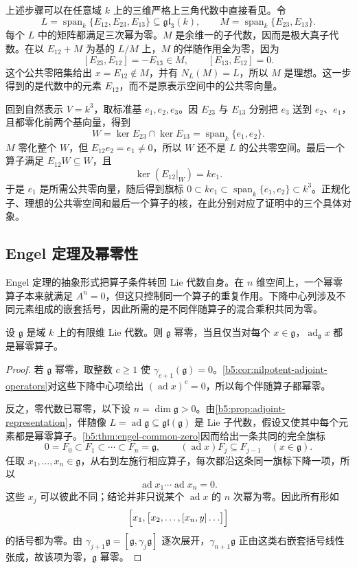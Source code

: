 上述步骤可以在任意域 \(k\) 上的三维严格上三角代数中直接看见。令
\[
	L=\operatorname{span}_k\{E_{12},E_{23},E_{13}\} \subseteq\mathfrak{gl}_3(k),\qquad M=\operatorname{span}_k\{E_{23},E_{13}\}.
\]
每个 \(L\) 中的矩阵都满足三次幂为零。\(M\) 是余维一的子代数，因而是极大真子代数。在以 \(E_{12}+M\) 为基的 \(L/M\) 上，\(M\) 的伴随作用全为零，因为
\[
	[E_{23},E_{12}]=-E_{13}\in M,\qquad [E_{13},E_{12}]=0.
\]
这个公共零陪集给出 \(x=E_{12}\notin M\)，并有 \(N_L(M)=L\)，所以 \(M\) 是理想。这一步得到的是代数中的元素 \(E_{12}\)，而不是原表示空间中的公共零向量。

\ProseParagraphBreak

回到自然表示 \(V=k^3\)，取标准基 \(e_1,e_2,e_3\)。因 \(E_{23}\) 与 \(E_{13}\) 分别把 \(e_3\) 送到 \(e_2\)、\(e_1\)，且都零化前两个基向量，得到
\[
	W=\ker E_{23}\cap\ker E_{13} =\operatorname{span}_k\{e_1,e_2\}.
\]
\(M\) 零化整个 \(W\)，但 \(E_{12}e_2=e_1\ne0\)，所以 \(W\) 还不是 \(L\) 的公共零空间。最后一个算子满足 \(E_{12}W\subseteq W\)，且
\[
	\ker(E_{12}|_W)=ke_1.
\]
于是 \(e_1\) 是所需公共零向量，随后得到旗标 \(0\subset ke_1\subset\operatorname{span}_k\{e_1,e_2\}\subset k^3\)。正规化子、理想的公共零空间和最后一个算子的核，在此分别对应了证明中的三个具体对象。

\subsection{Engel 定理及幂零性}
\label{b5:subsec:1201:03}

Engel 定理的抽象形式把算子条件转回 Lie 代数自身。在 \(n\) 维空间上，一个幂零算子本来就满足 \(A^n=0\)，但这只控制同一个算子的重复作用。下降中心列涉及不同元素组成的嵌套括号，因此所需的是不同伴随算子的混合乘积共同为零。

\begin{theorem}[Engel 定理]\label{b5:thm:engel}
	设 \(\mathfrak g\) 是域 \(k\) 上的有限维 Lie 代数。则 \(\mathfrak g\) 幂零，当且仅当对每个 \(x\in\mathfrak g\)，\(\operatorname{ad}_{\mathfrak g}x\) 都是幂零算子。
\end{theorem}
\begin{proof}
	若 \(\mathfrak g\) 幂零，取整数 \(c\ge1\) 使 \(\gamma_{c+1}(\mathfrak g)=0\)。\cref{b5:cor:nilpotent-adjoint-operators}对这些下降中心项给出 \((\operatorname{ad}x)^c=0\)，所以每个伴随算子都幂零。

	反之，零代数已幂零，以下设 \(n=\dim\mathfrak g>0\)。由\cref{b5:prop:adjoint-representation}，伴随像 \(L=\operatorname{ad}\mathfrak g\subseteq\mathfrak{gl}(\mathfrak g)\) 是 Lie 子代数，假设又使其中每个元素都是幂零算子。\cref{b5:thm:engel-common-zero}因而给出一条共同的完全旗标
	\[
		0=F_0\subset F_1\subset\cdots\subset F_n=\mathfrak g, \qquad (\operatorname{ad}x)F_j\subseteq F_{j-1} \quad(x\in\mathfrak g).
	\]
	任取 \(x_1,\ldots,x_n\in\mathfrak g\)，从右到左施行相应算子，每次都沿这条同一旗标下降一项，所以
	\[
		\operatorname{ad}x_1\cdots\operatorname{ad}x_n=0.
	\]
	这些 \(x_j\) 可以彼此不同；结论并非只说某个 \(\operatorname{ad}x\) 的 \(n\) 次幂为零。因此所有形如
	\[
		\Bigl[x_1,\bigl[x_2,\ldots,[x_n,y]\ldots\bigr]\Bigr]
	\]
	的括号都为零。由 \(\gamma_{j+1}\mathfrak g=[\mathfrak g,\gamma_j\mathfrak g]\) 逐次展开，\(\gamma_{n+1}\mathfrak g\) 正由这类右嵌套括号线性张成，故该项为零，\(\mathfrak g\) 幂零。
\end{proof}

